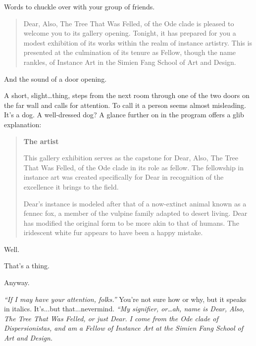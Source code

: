 Words to chuckle over with your group of friends.

\begin{quote}
Dear, Also, The Tree That Was Felled, of the Ode clade is pleased to welcome you to its gallery opening. Tonight, it has prepared for you a modest exhibition of its works within the realm of instance artistry. This is presented at the culmination of its tenure as Fellow, though the name rankles, of Instance Art in the Simien Fang School of Art and Design.
\end{quote}

And the sound of a door opening.

\vfill

\newpage
\null
\vfill

A short, slight\ldots{}thing, steps from the next room through one of the two doors on the far wall and calls for attention. To call it a person seems almost misleading. It's a dog. A well-dressed dog? A glance further on in the program offers a glib explanation:

\begin{quote}
\textbf{The artist}

This gallery exhibition serves as the capstone for Dear, Also, The Tree That Was Felled, of the Ode clade in its role as fellow. The fellowship in instance art was created specifically for Dear in recognition of the excellence it brings to the field.

Dear's instance is modeled after that of a now-extinct animal known as a fennec fox, a member of the vulpine family adapted to desert living. Dear has modified the original form to be more akin to that of humans. The iridescent white fur appears to have been a happy mistake.
\end{quote}

\vfill
\newpage

\null
\vfill

Well.

\null
\vfill

\newpage

\null
\vfill

That's a thing.

\null
\vfill

\newpage

\null
\vfill

Anyway.

\null
\vfill

\newpage

\emph{``If I may have your attention, folks.''} You're not sure how or why, but it speaks in italics. It's...but that...nevermind. \emph{``My signifier, or\ldots{}ah, name is Dear, Also, The Tree That Was Felled, or just Dear. I come from the Ode clade of Dispersionistas, and am a Fellow of Instance Art at the Simien Fang School of Art and Design.}


